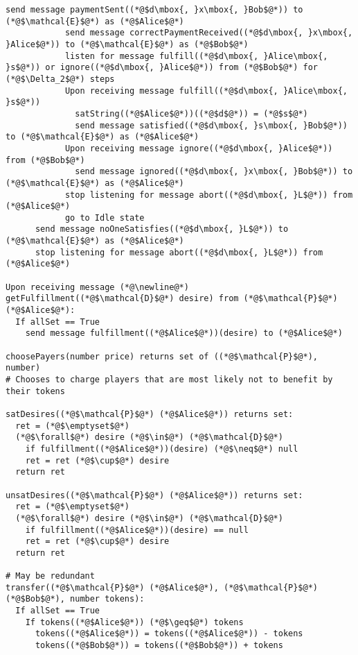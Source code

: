 \begin{lstlisting}[label=satfunc, style=numbers]
            send message paymentSent((*@$d\mbox{, }x\mbox{, }Bob$@*)) to (*@$\mathcal{E}$@*) as (*@$Alice$@*)
            send message correctPaymentReceived((*@$d\mbox{, }x\mbox{, }Alice$@*)) to (*@$\mathcal{E}$@*) as (*@$Bob$@*)
            listen for message fulfill((*@$d\mbox{, }Alice\mbox{, }s$@*)) or ignore((*@$d\mbox{, }Alice$@*)) from (*@$Bob$@*) for (*@$\Delta_2$@*) steps
            Upon receiving message fulfill((*@$d\mbox{, }Alice\mbox{, }s$@*))
              satString((*@$Alice$@*))((*@$d$@*)) = (*@$s$@*)
              send message satisfied((*@$d\mbox{, }s\mbox{, }Bob$@*)) to (*@$\mathcal{E}$@*) as (*@$Alice$@*)
            Upon receiving message ignore((*@$d\mbox{, }Alice$@*)) from (*@$Bob$@*)
              send message ignored((*@$d\mbox{, }x\mbox{, }Bob$@*)) to (*@$\mathcal{E}$@*) as (*@$Alice$@*)
            stop listening for message abort((*@$d\mbox{, }L$@*)) from (*@$Alice$@*)
            go to Idle state
      send message noOneSatisfies((*@$d\mbox{, }L$@*)) to (*@$\mathcal{E}$@*) as (*@$Alice$@*)
      stop listening for message abort((*@$d\mbox{, }L$@*)) from (*@$Alice$@*)

Upon receiving message (*@\newline@*) getFulfillment((*@$\mathcal{D}$@*) desire) from (*@$\mathcal{P}$@*) (*@$Alice$@*):
  If allSet == True
    send message fulfillment((*@$Alice$@*))(desire) to (*@$Alice$@*)

choosePayers(number price) returns set of ((*@$\mathcal{P}$@*), number)
# Chooses to charge players that are most likely not to benefit by their tokens

satDesires((*@$\mathcal{P}$@*) (*@$Alice$@*)) returns set:
  ret = (*@$\emptyset$@*)
  (*@$\forall$@*) desire (*@$\in$@*) (*@$\mathcal{D}$@*)
    if fulfillment((*@$Alice$@*))(desire) (*@$\neq$@*) null
    ret = ret (*@$\cup$@*) desire
  return ret

unsatDesires((*@$\mathcal{P}$@*) (*@$Alice$@*)) returns set:
  ret = (*@$\emptyset$@*)
  (*@$\forall$@*) desire (*@$\in$@*) (*@$\mathcal{D}$@*)
    if fulfillment((*@$Alice$@*))(desire) == null
    ret = ret (*@$\cup$@*) desire
  return ret

# May be redundant
transfer((*@$\mathcal{P}$@*) (*@$Alice$@*), (*@$\mathcal{P}$@*) (*@$Bob$@*), number tokens):
  If allSet == True
    If tokens((*@$Alice$@*)) (*@$\geq$@*) tokens
      tokens((*@$Alice$@*)) = tokens((*@$Alice$@*)) - tokens
      tokens((*@$Bob$@*)) = tokens((*@$Bob$@*)) + tokens
\end{lstlisting}
